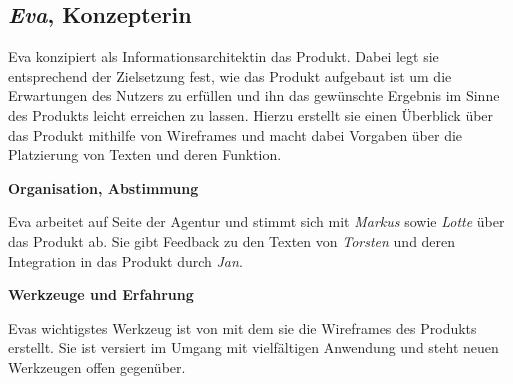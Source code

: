\pagebreak

\subsection{\emph{Eva}, Konzepterin}\label{p:eva}

\begin{multicols}{2}

\begin{center}
\end{center}


Eva konzipiert als Informationsarchitektin das Produkt. Dabei legt sie entsprechend der Zielsetzung fest, wie das Produkt aufgebaut ist um die Erwartungen des Nutzers zu erfüllen und ihn das gewünschte Ergebnis im Sinne des Produkts leicht erreichen zu lassen. Hierzu erstellt sie einen Überblick über das Produkt mithilfe von Wireframes und macht dabei Vorgaben über die Platzierung von Texten und deren Funktion.

\textbf{Organisation, Abstimmung}

Eva arbeitet auf Seite der Agentur und stimmt sich mit \emph{Markus} sowie \emph{Lotte} über das Produkt ab. Sie gibt Feedback zu den Texten von \emph{Torsten} und deren Integration in das Produkt durch \emph{Jan}.

\textbf{Werkzeuge und Erfahrung}

Evas wichtigstes Werkzeug ist  von  mit dem sie die Wireframes des Produkts erstellt. Sie ist versiert im Umgang mit vielfältigen Anwendung und steht neuen Werkzeugen offen gegenüber.


\end{multicols}
